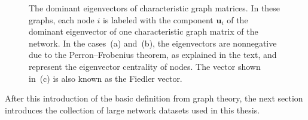 \documentclass[11pt,a4paper]{book}
\begin{document}
\begin{figure}[b!]
  \caption{
    The dominant eigenvectors of characteristic graph matrices. 
    In these graphs, each node $i$ is labeled with the component
    $\mathbf u_i$ of the dominant eigenvector of one characteristic
    graph matrix of the network. In the cases~(a) and~(b), the
    eigenvectors are 
    nonnegative due to the Perron--Frobenius theorem, as explained in
    the text, and represent the eigenvector centrality of nodes.  
    The vector shown in~(c) is also known as the Fiedler vector. 
  }
  \label{fig:syn-decomp}
\end{figure}

After this introduction of the basic definition from graph theory, the
next section introduces the collection of large network datasets used in
this thesis.   
\end{document}
